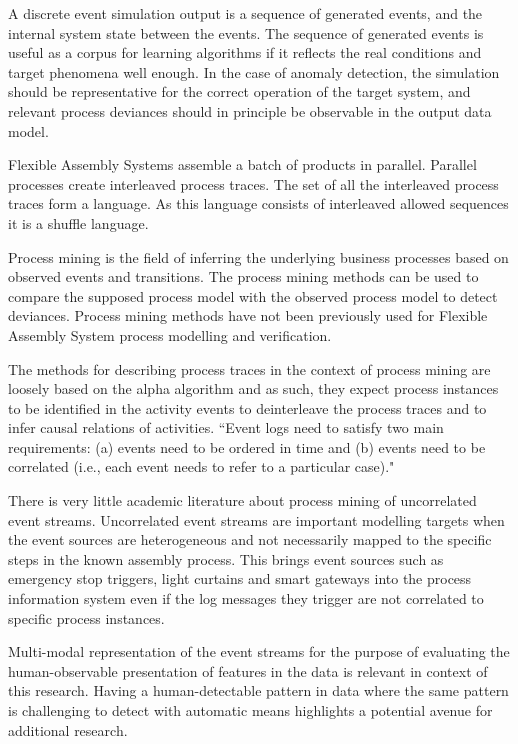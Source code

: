 \documentclass[a4paper,10pt]{article}
\begin{document}
A discrete event simulation output is a sequence of generated events,
and the internal system state between the events. The sequence of generated events is useful as a corpus for learning algorithms if it reflects the real conditions and
target phenomena well enough. In the case of anomaly detection, the simulation should be representative for the correct operation of the target system, and relevant process deviances
should in principle be observable in the output data model.

Flexible Assembly Systems assemble a batch of products in parallel.
Parallel processes create interleaved process traces. The set of all the interleaved process traces form a language. As this language consists of interleaved allowed sequences
it is a shuffle language\cite{berglund2011recognizing}.

Process mining is the field of inferring the underlying business processes based on observed events and transitions. The process mining methods can be used
to compare the supposed process model with the observed process model to detect deviances. Process mining methods have not been previously used for
Flexible Assembly System process modelling and verification.

The methods for describing process traces in the context of process mining are loosely based on the alpha algorithm\cite{van2004workflow} and as such, they expect process instances
to be identified in the activity events to deinterleave the process traces and to infer causal relations of activities.
``Event logs need to satisfy two main requirements: (a) events need to be ordered in time and (b) events need to be correlated
(i.e., each event needs to refer to a particular case)."\cite{van2011process}

There is very little academic literature about process mining of uncorrelated event streams. Uncorrelated event streams are important modelling targets when the event sources
are heterogeneous and not necessarily mapped to the specific steps in the known assembly process. This brings event sources such as emergency stop triggers, light curtains and
smart gateways into the process information system even if the log messages they trigger are not correlated to specific process instances.

Multi-modal representation of the event streams for the purpose of evaluating the human-observable presentation of features in the data is relevant in context of this research.
Having a human-detectable pattern in data where the same pattern is challenging to
detect with automatic means highlights a potential avenue for additional research.
\end{document}
